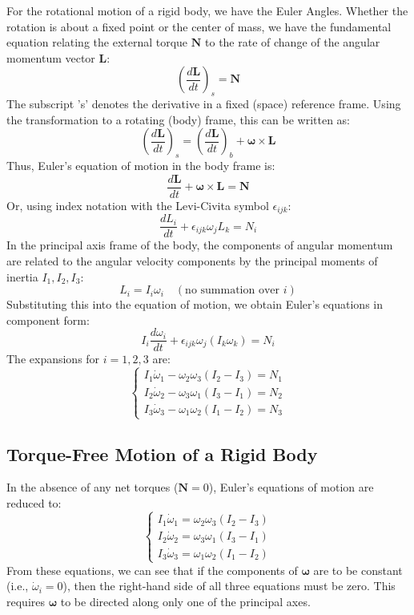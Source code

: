 \documentclass[12pt]{article}
\renewcommand{\vec}[1]{\mathbf{#1}}
\begin{document}
	For the rotational motion of a rigid body, we have the Euler Angles. Whether the rotation is about a fixed point or the center of mass, we have the fundamental equation relating the external torque $\vec{N}$ to the rate of change of the angular momentum vector $\vec{L}$:
	$$
	\left( \frac{d\vec{L}}{dt} \right)_s = \vec{N}
	$$
	The subscript 's' denotes the derivative in a fixed (space) reference frame. Using the transformation to a rotating (body) frame, this can be written as:
	$$
	\left( \frac{d\vec{L}}{dt} \right)_s = \left( \frac{d\vec{L}}{dt} \right)_b + \vec{\omega} \times \vec{L}
	$$
	Thus, Euler's equation of motion in the body frame is:
	$$
	\frac{d\vec{L}}{dt} + \vec{\omega} \times \vec{L} = \vec{N}
	$$
	Or, using index notation with the Levi-Civita symbol $\epsilon_{ijk}$:
	$$
	\frac{dL_i}{dt} + \epsilon_{ijk} \omega_j L_k = N_i
	$$
	In the principal axis frame of the body, the components of angular momentum are related to the angular velocity components by the principal moments of inertia $I_1, I_2, I_3$:
	$$
	L_i = I_i \omega_i \quad (\text{no summation over } i)
	$$
	Substituting this into the equation of motion, we obtain Euler's equations in component form:
	$$
	I_i \frac{d\omega_i}{dt} + \epsilon_{ijk} \omega_j (I_k \omega_k) = N_i
	$$
	The expansions for $i=1,2,3$ are:
	$$
	\begin{cases}
		I_1 \dot{\omega}_1 - \omega_2 \omega_3 (I_2 - I_3) = N_1 \\
		I_2 \dot{\omega}_2 - \omega_3 \omega_1 (I_3 - I_1) = N_2 \\
		I_3 \dot{\omega}_3 - \omega_1 \omega_2 (I_1 - I_2) = N_3
	\end{cases}
	$$
	
	\subsection{Torque-Free Motion of a Rigid Body}
	In the absence of any net torques ($\vec{N} = 0$), Euler's equations of motion are reduced to:
	$$
	\begin{cases}
		I_1 \dot{\omega}_1 = \omega_2 \omega_3 (I_2 - I_3) \\
		I_2 \dot{\omega}_2 = \omega_3 \omega_1 (I_3 - I_1) \\
		I_3 \dot{\omega}_3 = \omega_1 \omega_2 (I_1 - I_2)
	\end{cases}
	$$
	From these equations, we can see that if the components of $\vec{\omega}$ are to be constant (i.e., $\dot{\omega}_i=0$), then the right-hand side of all three equations must be zero. This requires $\vec{\omega}$ to be directed along only one of the principal axes.
	
\end{document}
